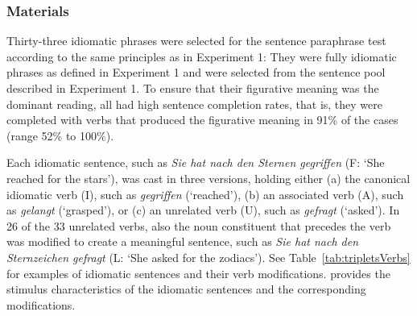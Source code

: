 \documentclass[output=paper]{langsci/langscibook}
\begin{document}
\subsubsection{Materials}
Thirty-three idiomatic phrases were selected for the sentence paraphrase test according to the same principles as in Experiment 1: They were fully idiomatic phrases as defined in Experiment 1 and were selected from the sentence pool described in Experiment 1. To ensure that their figurative meaning was the dominant reading, all had high sentence completion rates, that is, they were completed with verbs that produced the figurative meaning in 91\% of the cases (range 52\% to 100\%).

Each idiomatic sentence, such as \textit{Sie hat nach den Sternen gegriffen} (F: `She reached for the stars'), was cast in three versions, holding either (a) the canonical idiomatic verb (I), such as \textit{gegriffen} (‘reached’), (b) an associated verb (A), such as \textit{gelangt} (‘grasped’), or (c) an unrelated verb (U), such as \textit{gefragt} (‘asked’). In 26 of the 33 unrelated verbs, also the noun constituent that precedes the verb was modified to create a meaningful sentence, such as \textit{Sie hat nach den Sternzeichen gefragt} (L: `She asked for the zodiacs'). See Table~\ref{tab:tripletsVerbs} for examples of idiomatic sentences and their verb modifications.   provides the stimulus characteristics of the idiomatic sentences and the corresponding modifications.

\begin{table}
\caption{Idiomatic sentences and stimulus characteristics of the idiomatic, modified, and unrelated verb constituents in Experiment 2. \textit{Notes:} N = number of items, Lemma = mean lemma frequency per one million, taken from CELEX \citep{baayen:1993}, Association = mean meaning association with idiomatic constituent, Closure = mean sentence completion in \%.\label{tab:exp2}}
\end{table}
\end{document}
